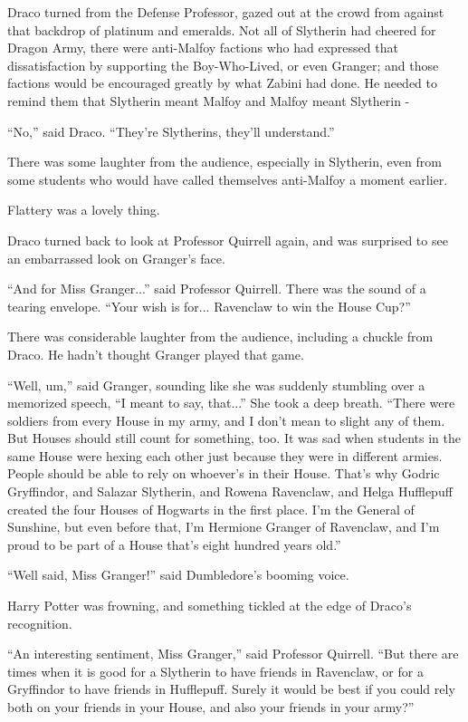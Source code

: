 Draco turned from the Defense Professor, gazed out at the crowd from
against that backdrop of platinum and emeralds. Not all of Slytherin had
cheered for Dragon Army, there were anti-Malfoy factions who had
expressed that dissatisfaction by supporting the Boy-Who-Lived, or even
Granger; and those factions would be encouraged greatly by what Zabini
had done. He needed to remind them that Slytherin meant Malfoy and
Malfoy meant Slytherin -

``No,'' said Draco. ``They're Slytherins, they'll understand.''

There was some laughter from the audience, especially in Slytherin, even
from some students who would have called themselves anti-Malfoy a moment
earlier.

Flattery was a lovely thing.

Draco turned back to look at Professor Quirrell again, and was surprised
to see an embarrassed look on Granger's face.

``And for Miss Granger...'' said Professor Quirrell. There was the
sound of a tearing envelope. ``Your wish is for... Ravenclaw to win
the House Cup?''

There was considerable laughter from the audience, including a chuckle
from Draco. He hadn't thought Granger played that game.

``Well, um,'' said Granger, sounding like she was suddenly stumbling
over a memorized speech, ``I meant to say, that...'' She took a
deep breath. ``There were soldiers from every House in my army, and I
don't mean to slight any of them. But Houses should still count for
something, too. It was sad when students in the same House were hexing
each other just because they were in different armies. People should be
able to rely on whoever's in their House. That's why Godric Gryffindor,
and Salazar Slytherin, and Rowena Ravenclaw, and Helga Hufflepuff
created the four Houses of Hogwarts in the first place. I'm the General
of Sunshine, but even before that, I'm Hermione Granger of Ravenclaw,
and I'm proud to be part of a House that's eight hundred years old.''

``Well said, Miss Granger!'' said Dumbledore's booming voice.

Harry Potter was frowning, and something tickled at the edge of Draco's
recognition.

``An interesting sentiment, Miss Granger,'' said Professor Quirrell.
``But there are times when it is good for a Slytherin to have friends in
Ravenclaw, or for a Gryffindor to have friends in Hufflepuff. Surely it
would be best if you could rely both on your friends in your House, and
also your friends in your army?''

